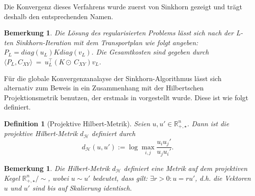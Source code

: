 \documentclass[twoside, 12pt,a4paper]{book}
\newtheorem{definition}[theorem]{Definition}
\newtheorem{remark}[theorem]{Bemerkung}
\numberwithin{equation}{section}
\begin{document}
		\noindent Die Konvergenz dieses Verfahrens wurde zuerst von Sinkhorn \cite{sinkhorn1964relationship} gezeigt und trägt deshalb den entsprechenden Namen.
	
	
	

	
	
	
	
	\begin{remark}
		Die Lösung des regularisierten Problems lässt sich nach der L-ten Sinkhorn-Iteration mit dem Transportplan wie folgt angeben: $P_L = diag(u_L)K diag(v_L)$. Die Gesamtkosten sind gegeben durch\\
		\noindent $\langle P_L, C_{XY}\rangle~=~u_L ^\top ( K \odot~ C_{XY})v_L$.	\end{remark}	
	
	
	\noindent Für die globale Konvergenzanalayse der Sinkhorn-Algorithmus lässt sich alternativ zum Beweis in \cite{sinkhorn1964relationship} ein Zusammenhang mit der Hilbertschen Projektionsmetrik benutzen, der erstmals in \cite{franklin_sinkhorn_convergence} vorgestellt wurde. Diese ist wie folgt definiert.
	
	\begin{definition}[Projektive Hilbert-Metrik]
		Seien $u,u' \in \mathbb{R}_{+,\star}^n$.
		Dann ist die projektive Hilbert-Metrik $d_\mathcal{H}$ definiert durch
		\begin{equation}
		d_\mathcal{H}(u,u') := \log \max_{i,j}{\frac{u_iu_j'}{u_ju_i'}}.
		\end{equation}
	\end{definition}
	
	\begin{remark}
		Die Hilbert-Metrik $ d_\mathcal{H}$ definiert eine Metrik auf dem projektiven Kegel $\mathbb{R}_{+, \star}^n/\sim$, wobei $u \sim u'$ bedeutet, dass gilt: $\exists r >0:u=ru'$, d.h. die Vektoren $u$ und $u'$ sind bis auf Skalierung identisch.
		
	\end{remark}
	

	
\end{document}
